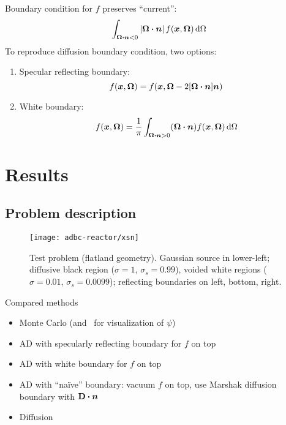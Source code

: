 \documentclass{beamer}
\begin{document}
\begin{frame}
  Boundary condition for $f$ preserves ``current'':
  \begin{align*}
  \int_{\bm{\Omega}\bm{\cdot}\bm{n} < 0} \left| \bm{\Omega}\bm{\cdot} \bm{n} \right|
  f(\bm{x}, \bm{\Omega}) \mathop{}\!\mathrm{d}\Omega
  \end{align*}
 To reproduce diffusion boundary condition, two options:
 \begin{enumerate}
   \item Specular reflecting boundary:
     \begin{equation*}
       f(\bm{x}, \bm{\Omega}) = f(\bm{x},\bm{\Omega} - 2[\bm{\Omega} \bm{\cdot}
         \bm{n}] \bm{n}) 
     \end{equation*}
   \item White boundary:
     \begin{equation*}
       f(\bm{x}, \bm{\Omega}) = \frac{1}{\pi} \int_{\bm{\Omega}\bm{\cdot}\bm{n} >
     0} (\bm{\Omega}\bm{\cdot} \bm{n}) f(\bm{x}, \bm{\Omega}) \mathop{}\!\mathrm{d}\Omega
     \end{equation*}
 \end{enumerate}
\end{frame}

\section{Results}

\subsection{Problem description}
\begin{frame}
\begin{figure}[tb]
  \texttt{[image: adbc-reactor/xsn]}

  \caption{Test problem (flatland geometry). Gaussian source in lower-left;
  diffusive black region ($\sigma=1$, $\sigma_s=0.99$), voided white regions
  ($\sigma=0.01$, $\sigma_s=0.0099$); reflecting boundaries on left, bottom,
  right.}
  \label{fig:problem}
\end{figure}
\end{frame}
  
\begin{frame}{Compared methods}
  \begin{itemize}
    \item Monte Carlo (and \SN\ for visualization of $\psi$)
    \item AD with specularly reflecting boundary for $f$ on top
    \item AD with white boundary for $f$ on top
    \item AD with ``na\"ive'' boundary: vacuum $f$ on top, use Marshak diffusion
      boundary with $\mathbf{D} \bm{\cdot} \bm{n}$
    \item Diffusion
  \end{itemize}
\end{frame}
\end{document}

